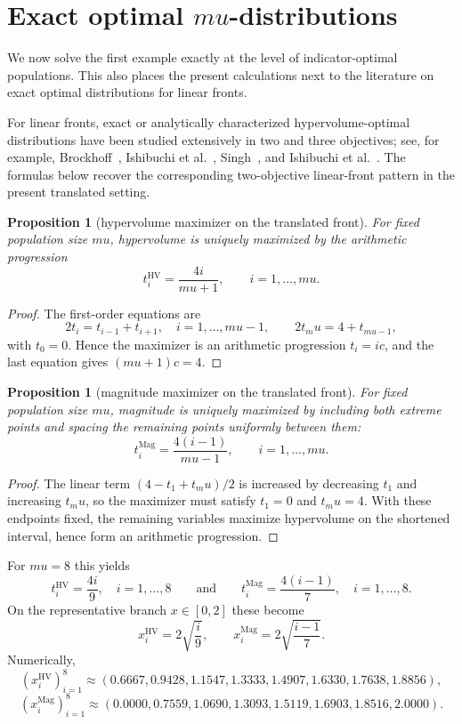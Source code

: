 \documentclass{article}
\def\mu{mu}%
\newtheorem{proposition}[theorem]{Proposition}
\theoremstyle{definition}
\newcommand{\1}{\mathbf{1}}
\begin{document}
\section{Exact optimal \texorpdfstring{$\mu$}{mu}-distributions}

We now solve the first example exactly at the level of indicator-optimal populations. This also places the present calculations next to the literature on exact optimal distributions for linear fronts.

For linear fronts, exact or analytically characterized hypervolume-optimal distributions have been studied extensively in two and three objectives; see, for example, Brockhoff~\cite{Brockhoff2010}, Ishibuchi et al.~\cite{IshibuchiImadaMasuyamaNojima2019}, Singh~\cite{Singh2025}, and Ishibuchi et al.~\cite{IshibuchiNanPang2025}. The formulas below recover the corresponding two-objective linear-front pattern in the present translated setting.
\begin{proposition}[hypervolume maximizer on the translated front]
For fixed population size $\mu$, hypervolume is uniquely maximized by the arithmetic progression
\[
t_i^{\mathrm{HV}}=\frac{4i}{\mu+1},
\qquad i=1,\dots,\mu.
\]
\end{proposition}

\begin{proof}
The first-order equations are
\[
2t_i=t_{i-1}+t_{i+1},
\quad i=1,\dots,\mu-1,
\qquad
2t_\mu=4+t_{\mu-1},
\]
with $t_0=0$. Hence the maximizer is an arithmetic progression $t_i=ic$, and the last equation gives $(\mu+1)c=4$.
\end{proof}

\begin{proposition}[magnitude maximizer on the translated front]
For fixed population size $\mu$, magnitude is uniquely maximized by including both extreme points and spacing the remaining points uniformly between them:
\[
t_i^{\mathrm{Mag}}=\frac{4(i-1)}{\mu-1},
\qquad i=1,\dots,\mu.
\]
\end{proposition}

\begin{proof}
The linear term $(4-t_1+t_\mu)/2$ is increased by decreasing $t_1$ and increasing $t_\mu$, so the maximizer must satisfy $t_1=0$ and $t_\mu=4$. With these endpoints fixed, the remaining variables maximize hypervolume on the shortened interval, hence form an arithmetic progression.
\end{proof}

For $\mu=8$ this yields
\[
\boxed{t_i^{\mathrm{HV}}=\frac{4i}{9},\quad i=1,\dots,8}
\qquad\text{and}\qquad
\boxed{t_i^{\mathrm{Mag}}=\frac{4(i-1)}{7},\quad i=1,\dots,8.}
\]
On the representative branch $x\in[0,2]$ these become
\[
x_i^{\mathrm{HV}}=2\sqrt{\frac{i}{9}},
\qquad
x_i^{\mathrm{Mag}}=2\sqrt{\frac{i-1}{7}}.
\]
Numerically,
\[
(x_i^{\mathrm{HV}})_{i=1}^8\approx(0.6667,0.9428,1.1547,1.3333,1.4907,1.6330,1.7638,1.8856),
\]
\[
(x_i^{\mathrm{Mag}})_{i=1}^8\approx(0.0000,0.7559,1.0690,1.3093,1.5119,1.6903,1.8516,2.0000).
\]
\end{document}
